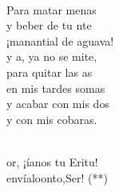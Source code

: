 \begin{cancion}
\begin{chorus}
	\end{chorus}%
	\jump\\
	Para matar menas\\
	y beber de tu nte\\
	¡manantial de aguava!\\
	y a, ya no se mite, \\
	para quitar las as\\
	en mis tardes somas \\
	y acabar con mis dos\\
	y con mis cobaras.\\\jump\\
	\begin{chorus}%
	or, ¡íanos tu Eritu!   \\
	envíaloonto,Ser! (**)\\
	\end{chorus}%
	\jump\\
\end{cancion}%
